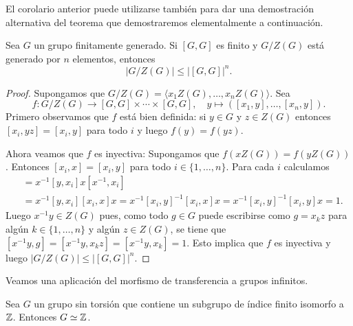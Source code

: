 El corolario anterior puede utilizarse también para dar una demostración
alternativa del teorema que demostraremos elementalmente a continuación. 

\begin{theorem}
	Sea $G$ un grupo finitamente generado. Si $[G,G]$ es finito y $G/Z(G)$ está generado por 
	$n$ elementos, entonces 
	\[
	|G/Z(G)|\leq |[G,G]|^n. 
	\]
\end{theorem}

\begin{proof}
	Supongamos que $G/Z(G)=\langle x_1Z(G),\dots,x_nZ(G)\rangle$. Sea 
	\[
		f\colon G/Z(G)\to [G,G]\times\cdots\times [G,G],
		\quad
		y\mapsto ([x_1,y],\dots,[x_n,y]).
	\]
	Primero observamos que $f$ está bien definida: si $y\in G$ y $z\in Z(G)$ entonces
	$[x_i,yz]=[x_i,y]$ para todo $i$ y luego $f(y)=f(yz)$. 
	
	Ahora veamos que $f$ es inyectiva: Supongamos que $f(xZ(G))=f(yZ(G))$. Entonces
	$[x_i,x]=[x_i,y]$ para todo $i\in\{1,\dots,n\}$. Para cada $i$ calculamos
	\begin{align*}
		[x^{-1}y,x_i] &= x^{-1}[y,x_i]x[x^{-1},x_i]\\
		&=x^{-1}[y,x_i][x_i,x]x=x^{-1}[x_i,y]^{-1}[x_i,x]x=x^{-1}[x_i,y]^{-1}[x_i,y]x=1.
	\end{align*}
	Luego $x^{-1}y\in Z(G)$ pues, como 
	todo $g\in G$ puede escribirse como $g=x_kz$ para algún $k\in\{1,\dots,n\}$ y algún $z\in Z(G)$, se tiene
	que $[x^{-1}y,g]=[x^{-1}y,x_kz]=[x^{-1}y,x_k]=1$. Esto implica que $f$ es inyectiva y luego
	$|G/Z(G)|\leq |[G,G]|^n$. 
\end{proof}



Veamos una aplicación del morfismo de transferencia a grupos infinitos.

\begin{theorem}
	Sea $G$ un grupo sin torsión que contiene un subgrupo de índice finito
	isomorfo a $\mathbb{Z}$. Entonces $G\simeq\mathbb{Z}$.
\end{theorem}

